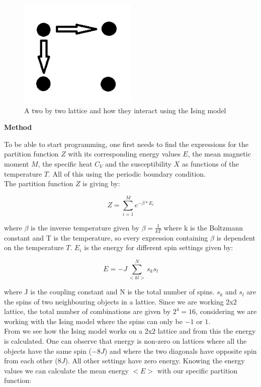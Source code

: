 \documentclass[10pt,a4paper]{article}
\begin{document}
\begin{figure}[H]
\centering
\includegraphics[width=0.5\textwidth]{22lattice}
\caption{A two by two lattice and how they interact using the Ising model}
\label{fig:22lattice}
\end{figure}




\newpage

\begin{center}
{\LARGE\bf Method}
\end{center}

\noindent To be able to start programming, one first needs to find the expressions for the partition function $Z$ with its corresponding energy values $E$, the mean magnetic moment $M$, the specific heat $C_V$ and the susceptibility $X$ as functions of the temperature $T$. All of this using the periodic boundary condition.
\\
The partition function $Z$ is giving by: 


$$
Z = \sum^{M}_{i = 1} e^{-\beta * E_i}
$$ 

\noindent where $\beta$ is the inverse temperature given by $\beta = \frac{1}{kT}$ where k is the Boltzmann constant and T is the temperature, so every expression containing $\beta$ is dependent on the temperature $T$. $E_i$ is the energy for different spin settings given by:

$$
E = -J\sum^{N}_{<kl>} s_ks_l
$$

\noindent where J is the coupling constant and N is the total number of spins. $s_k$ and $s_l$ are the spins of two neighbouring objects in a lattice. Since we are working 2x2 lattice, the total number of combinations are given by $2^4 = 16$, considering we are working with the Ising model where the spins can only be $-1$ or $1$.
\\
From  we see how the Ising model works on a 2x2 lattice and from this the energy is calculated. One can observe that energy is non-zero on lattices where all the objects have the same spin ($-8J$) and where the two diagonals have opposite spin from each other ($8J$). All other settings have zero energy. Knowing the energy values we can calculate the mean energy $<E>$ with our specific partition function:
\end{document}
